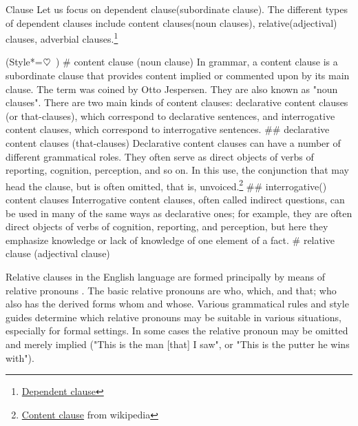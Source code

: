 \begin{writing}[18-8-24]{Clause}
Let us focus on dependent clause(subordinate clause). The different types of dependent clauses include {\color{google@yellow}content clauses(noun clauses)},
{\color{google@yellow}relative(adjectival) clauses}, {\color{google@yellow} adverbial clauses}.\footnote{\href{https://en.wikipedia.org/wiki/Dependent_clause}{Dependent clause}}
\begin{easylist}[checklist]
\ListProperties(Style*=$\heartsuit\hskip.5em$)
# content clause (noun clause)\newline
    {\color{gray}
    In grammar, a content clause is a subordinate clause that provides content implied or 
    commented upon by its main clause. The term was coined by Otto Jespersen. 
    They are also known as "noun clauses". There are two main kinds of 
    content clauses: declarative content clauses (or that-clauses), which correspond to 
    declarative sentences, and interrogative content clauses, which correspond to interrogative sentences.
    }
## declarative content clauses (that-clauses)\newline
    {\color{gray}Declarative content clauses can have a number of different grammatical 
    roles. They often serve as direct objects of verbs of reporting, cognition,
    perception, and so on. In this use, the conjunction that may 
    head the clause, but is often omitted, that is, unvoiced.\footnote{
        \href{https://en.wikipedia.org/wiki/Content_clause}{Content clause} from wikipedia}}
## interrogative() content clauses\newline
    {\color{gray}Interrogative content clauses, often called indirect questions, can be used in many of 
    the same ways as declarative ones; for example, they are often direct objects 
    of verbs of cognition, reporting, and perception, but here they emphasize knowledge 
    or lack of knowledge of one element of a fact.}
# relative clause (adjectival clause)\newline
    {\color{gray}
    Relative clauses in the English language are formed principally by means of relative pronouns
    . The basic relative pronouns are who, which, and that; who also 
    has the derived forms whom and whose. Various grammatical rules and style guides determine 
    which relative pronouns may be suitable in various situations, especially for formal settings. 
    In some cases the relative pronoun may be omitted and merely implied ("This is 
    the man [that] I saw", or "This is the putter he wins with").

}
\end{easylist}
\end{writing}
